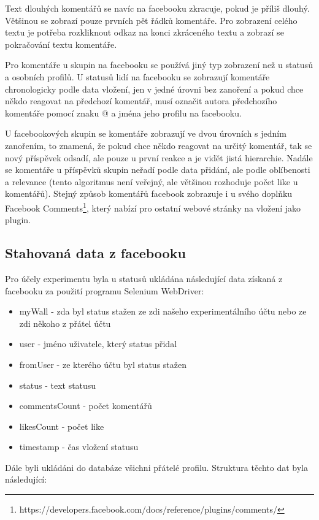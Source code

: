 \documentclass[thesis=M,czech]{FITthesis}[2013/05/10]
\begin{document}
Text dlouhých komentářů se navíc na facebooku zkracuje, pokud je příliš dlouhý. Většinou se zobrazí pouze prvních pět řádků komentáře. Pro zobrazení celého textu je potřeba rozkliknout odkaz na konci zkráceného textu a zobrazí se pokračování textu komentáře. 

Pro komentáře u skupin na facebooku se používá jiný typ zobrazení než u statusů a osobních profilů. U statusů lidí na facebooku se zobrazují komentáře chronologicky podle data vložení, jen v jedné úrovni bez zanoření a pokud chce někdo reagovat na předchozí komentář, musí označit autora předchozího komentáře pomocí znaku @ a jména jeho profilu na facebooku. 

U facebookových skupin se komentáře zobrazují ve dvou úrovních s jedním zanořením, to znamená, že pokud chce někdo reagovat na určitý komentář, tak se nový příspěvek odsadí, ale pouze u první reakce a je vidět jistá hierarchie. Nadále se komentáře u příspěvků skupin neřadí podle data přidání, ale podle oblíbenosti a relevance (tento algoritmus není veřejný, ale většinou rozhoduje počet like u komentářů). Stejný způsob komentářů facebook zobrazuje i u svého doplňku Facebook Comments\footnote{https://developers.facebook.com/docs/reference/plugins/comments/}, který nabízí pro ostatní webové stránky na vložení jako plugin. 

\subsection{Stahovaná data z facebooku}

Pro účely experimentu byla u statusů ukládána následující data získaná z facebooku za použití programu Selenium WebDriver:

\begin{itemize}
  \item myWall - zda byl status stažen ze zdi našeho experimentálního účtu nebo ze zdi někoho z přátel účtu
  \item user - jméno uživatele, který status přidal
  \item fromUser - ze kterého účtu byl status stažen  
  \item status - text statusu
  \item commentsCount - počet komentářů
  \item likesCount - počet like
  \item timestamp - čas vložení statusu
\end{itemize}

Dále byli ukládáni do databáze všichni přátelé profilu. Struktura těchto dat byla následující:
\end{document}
